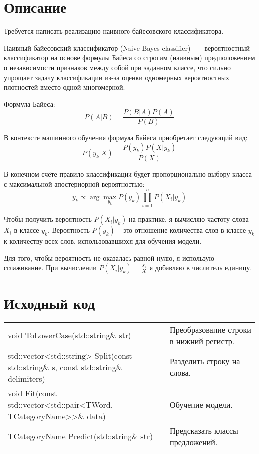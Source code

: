 \section{Описание}
Требуется написать реализацию наивного байесовского классификатора.

Наивный байесовский классификатор (Naive Bayes classifier) —- вероятностный классификатор на основе формулы Байеса 
со строгим (наивным) предположением о независимости признаков между собой при заданном классе, 
что сильно упрощает задачу классификации из-за оценки одномерных вероятностных плотностей вместо одной многомерной\cite{Habr}.

Формула Байеса: $$P(A | B) = \frac{P(B | A) P(A)}{P(B)}$$

В контексте машинного обучения формула Байеса приобретает следующий вид: $$P(y_k | X) = \frac{P(y_k) P(X | y_k)}{P(X)}$$

В конечном счёте правило классификации будет пропорционально выбору класса с максимальной апостериорной вероятностью:
$$y_k \propto \arg \max_{y_k} P(y_k) \prod^n_{i = 1} P(X_i | y_k)$$

Чтобы получить вероятность $P(X_i | y_k)$ на практике, я вычисляю частоту слова $X_i$ в классе $y_k$.
Вероятность $P(y_k)$ -- это отношение количества слов в классе $y_k$ к количеству всех слов, использовавшихся для
обучения модели.

Для того, чтобы вероятность не оказалась равной нулю, я использую сглаживание. При вычислении $P(X_i | y_k) = \frac{X_i}{X}$
я добавляю в числитель единицу.

\pagebreak

\section{Исходный код}
\begin{longtable}{|p{7.5cm}|p{7.5cm}|}
\hline
\rowcolor{lightgray}
\multicolumn{2}{|c|} {}\\
\hline
void ToLowerCase(std::string\& str)&Преобразование строки в нижний регистр.\\
\hline
std::vector<std::string> Split(const std::string\& s, const std::string\& delimiters)&Разделить строку на слова.\\
\hline
void Fit(const std::vector<std::pair<TWord, TCategoryName>>\& data)&Обучение модели.\\
\hline
TCategoryName Predict(std::string\& str)&Предсказать классы предложений.\\
\hline
\end{longtable}

